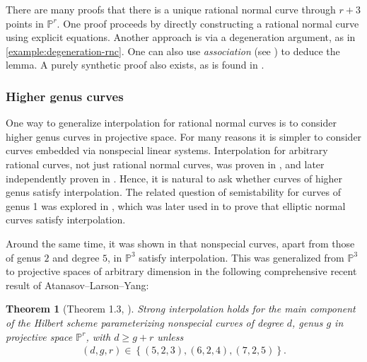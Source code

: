 \documentclass[reqno, 11pt]{amsart}
\theoremstyle{definition}
\theoremstyle{remark}
\numberwithin{equation}{section}
\numberwithin{thm}{section}
\numberwithin{prop}{section}
\numberwithin{lem}{section}
\numberwithin{cor}{section}
\numberwithin{conj}{section}
\numberwithin{defn}{section}
\theoremstyle{plain}
\newtheorem{theorem}{Theorem}[section]
\theoremstyle{definition}
\newcommand\bp{{\mathbb P}}
\begin{document}
There are many proofs that there is a unique rational normal curve through $r + 3$ points in $\bp^r$.  One proof proceeds by directly constructing a rational normal curve using explicit equations.  Another approach is via a degeneration argument, as in \autoref{example:degeneration-rnc}. One can also use {\sl association} (see \cite{eisenbudP:the-projective-geometry-of-the-gale-transform}) to deduce the lemma.  A purely synthetic proof also exists, as is found in \cite[Proposition 2.4.4]{pereiraP:an-invitation-to-web-geometry}.
\subsubsection{Higher genus curves} One way to generalize interpolation
for rational normal curves is to consider higher genus curves in projective space. For many reasons it is simpler to consider curves embedded via nonspecial linear systems.  
Interpolation for arbitrary rational curves, not just rational normal curves, was proven in \cite{sacchiero:normal-bundles-of-rational-curves-in-projective-space},
and later independently proven in \cite{ran:normal-bundles-of-rational-curves-in-projective-spaces}.
Hence, it is natural to ask whether curves of higher genus satisfy interpolation.
The related question of semistability for curves of genus 1 was explored in
\cite{einL:stability-and-restrictions-of-picard-bundles},
which was later used in
\cite[Theorem 1]{ballico2014interpolation} to prove that elliptic normal curves satisfy interpolation.

Around the same time, it was shown in \cite[Theorem 7.1]{atanasov:interpolation-and-vector-bundles-on-curves} that nonspecial curves, apart from those of genus $2$ and degree $5$, in $\mathbb P^3$ satisfy interpolation.
This was generalized from $\mathbb P^3$ to projective spaces of arbitrary dimension in the following comprehensive recent result of Atanasov--Larson--Yang:

\begin{theorem}[Theorem 1.3, \cite{atanasovLY:interpolation-for-normal-bundles-of-general-curves}]\label{thm:NaskoEricDavid}
Strong interpolation holds for the main component of the Hilbert scheme parameterizing nonspecial curves of degree $d$, genus $g$ in projective space $\bp^{r}$, with $d \geq g + r$ unless
\begin{align*}
	(d,g,r) \in \left\{ (5,2,3), (6,2,4), (7,2,5) \right\}.
\end{align*}
\end{theorem}
\end{document}
